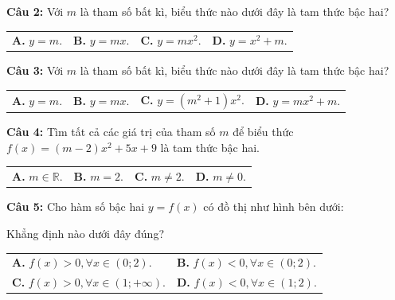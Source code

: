 \documentclass[12pt,a4paper]{extarticle}
\begin{document}
\noindent\textbf{Câu 2:} Với $m$ là tham số bất kì, biểu thức nào dưới đây là tam thức bậc hai?
\begin{center}
\begin{tabular}{p{3.5cm} p{3.5cm} p{3.5cm} p{3.5cm}}
\textbf{A.} $y=m$. & \textbf{B.} $y=mx$. & \textbf{C.} $y=mx^2$. & \textbf{D.} $y=x^2+m$.
\end{tabular}
\end{center}
\noindent\textbf{Câu 3:} Với $m$ là tham số bất kì, biểu thức nào dưới đây là tam thức bậc hai?
\begin{center}
\begin{tabular}{p{3.5cm} p{3.5cm} p{3.5cm} p{3.5cm}}
\textbf{A.} $y=m$. & \textbf{B.} $y=mx$. & \textbf{C.} $y=(m^2+1)x^2$. & \textbf{D.} $y=mx^2+m$.
\end{tabular}
\end{center}
\noindent\textbf{Câu 4:} Tìm tất cả các giá trị của tham số $m$ để biểu thức $f(x)=(m-2)x^2+5x+9$ là tam thức bậc hai.
\begin{center}
\begin{tabular}{p{3.5cm} p{3.5cm} p{3.5cm} p{3.5cm}}
\textbf{A.} $m \in \mathbb{R}$. & \textbf{B.} $m=2$. & \textbf{C.} $m \neq 2$. & \textbf{D.} $m \neq 0$.
\end{tabular}
\end{center}
\noindent\textbf{Câu 5:} Cho hàm số bậc hai $y=f(x)$ có đồ thị như hình bên dưới:
\begin{center}
\end{center}
Khẳng định nào dưới đây đúng?
\begin{center}
\begin{tabular}{p{7.5cm} p{7.5cm}}
\textbf{A.} $f(x)>0, \forall x \in (0;2)$. & \textbf{B.} $f(x)<0, \forall x \in (0;2)$. \\
\textbf{C.} $f(x)>0, \forall x \in (1;+\infty)$. & \textbf{D.} $f(x)<0, \forall x \in (1;2)$.
\end{tabular}
\end{center}
\end{document}

